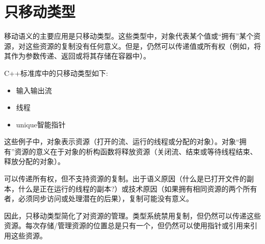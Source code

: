 \chapter{只移动类型}
移动语义的主要应用是只移动类型。这些类型中，对象代表某个值或“拥有”某个资源，对这些资源的复制没有任何意义。但是，仍然可以传递值或所有权（例如，将其作为参数传递、返回或将其存储在容器中）。

C++标准库中的只移动类型如下:

\begin{itemize}
	\item 输入输出流
	\item 线程
	\item unique智能指针
\end{itemize}

这些例子中，对象表示资源（打开的流、运行的线程或分配的对象）。对象“拥有”资源的意义在于对象的析构函数将释放资源（关闭流、结束或等待线程结束、释放分配的对象）。

可以传递所有权，但不支持资源的复制。出于语义原因（什么是已打开文件的副本，什么是正在运行的线程的副本?）或技术原因（如果拥有相同资源的两个所有者，必须同步访问或处理潜在的后果），复制可能没有意义。

因此，只移动类型简化了对资源的管理。类型系统禁用复制，但仍然可以传递这些资源。每次存储/管理资源的位置总是只有一个，但仍然可以使用指针或引用来引用这些资源。


























































